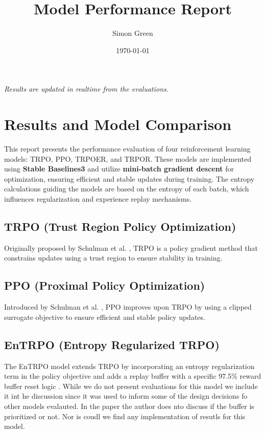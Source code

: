\documentclass{article}
\begin{document}
\title{Model Performance Report}
\author{Simon Green}
\date{\today}
\maketitle

\begin{center}

  {\it Results are updated in realtime from the evaluations.}
\end{center}

\section{Results and Model Comparison} 

This report presents the performance evaluation of four reinforcement learning models: TRPO, PPO, TRPOER, and TRPOR. These models are implemented using \textbf{Stable Baselines3} and utilize \textbf{mini-batch gradient descent} for optimization, ensuring efficient and stable updates during training. The entropy calculations guiding the models are based on the entropy of each batch, which influences regularization and experience replay mechanisms. 


\subsection{TRPO (Trust Region Policy Optimization)}

Originally proposed by Schulman et al. \cite{schulman2017trustregionpolicyoptimization}, TRPO is a policy gradient method that constrains updates using a trust region to ensure stability in training.

\subsection{PPO (Proximal Policy Optimization)}

Introduced by Schulman et al. \cite{schulman2017proximalpolicyoptimizationalgorithms}, PPO improves upon TRPO by using a clipped surrogate objective to ensure efficient and stable policy updates.

\subsection{EnTRPO (Entropy Regularized TRPO)}

The EnTRPO model extends TRPO by incorporating an entropy regularization term in the policy objective and adds a replay buffer with a specific 97.5\% reward buffer reset logic \cite{roostaie2021entrpotrustregionpolicy}. While we do not present evaluations for this model we include it int he discussion since it was used to inform some of the design decisions fo other models evalauted. In the paper the author does nto discuss if the buffer is prioritized or not. Nor is coudl we find any implementation of resutls for this model.
\end{document}
